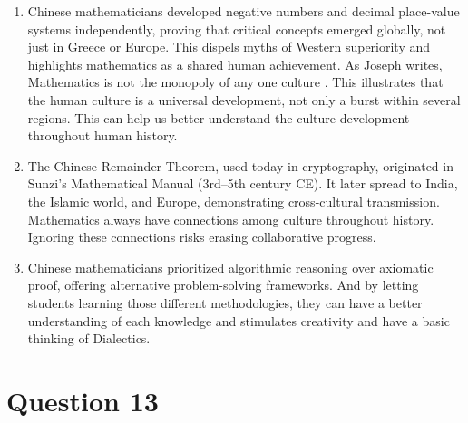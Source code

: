 \documentclass{article}
\begin{document}
\begin{enumerate}
    \item Chinese mathematicians developed negative numbers and decimal place-value systems independently, proving that critical concepts emerged globally, not just in Greece or Europe. This dispels myths of Western superiority and highlights mathematics as a shared human achievement. As Joseph writes, Mathematics is not the monopoly of any one culture .\cite{joseph1991crest} This illustrates that the human culture is a universal development, not only a burst within several regions. This can help us better understand the culture development throughout human history. 
    \item The Chinese Remainder Theorem, used today in cryptography, originated in Sunzi’s Mathematical Manual (3rd–5th century CE). It later spread to India, the Islamic world, and Europe, demonstrating cross-cultural transmission. Mathematics always have connections among culture throughout history. Ignoring these connections risks erasing collaborative progress.
    \item Chinese mathematicians prioritized algorithmic reasoning over axiomatic proof, offering alternative problem-solving frameworks. And by letting students learning those different methodologies, they can have a better understanding of each knowledge and stimulates creativity and have a basic thinking of Dialectics.
\end{enumerate}

\newpage

\section*{Question 13}
\end{document}
